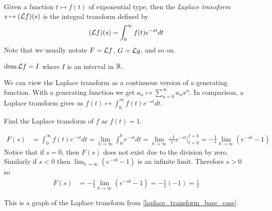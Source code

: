 \documentclass[notes]{subfiles}
\begin{document}
\begin{definition}
    Given a function $t \mapsto f(t)$ of exponential type, then the \textit{Laplace transform} $s \mapsto (\mathcal{L} f)(s)$ is the integral transform defined by
    \[
        (\mathcal{L} f)(s) = \int_0^\infty f(t)e^{-st}dt
    \]
    Note that we usually notate $F = \mathcal{L} f$, $G = \mathcal{L} g$, and so on.
\end{definition}

\begin{theorem}
    $\operatorname{dom} \mathcal{L} f = I$ where $I$ is an interval in $\mathbb{R}$.
\end{theorem}

We can view the Laplace transform as a continuous version of a generating function. With a generating function we get $a_n \mapsto \sum_{n = 0}^\infty a_n x^n$. In comparison, a Laplace transform gives us $f(t) \mapsto \int_0^\infty f(t)e^{-st}dt$.

\begin{exercise} \label{laplace_transform_base_case}
    Find the Laplace transform of $f$ as $f(t) = 1$.
\end{exercise}
\begin{solution}
    \begin{align*}
        F(s)
        &= \int_0^\infty f(t)e^{-st}dt
        = \lim_{b\to\infty} \int_0^b e^{-st}dt
        = \lim_{b\to\infty} \frac{-1}{s}e^{-st}\Big|_{t = 0}^{t = b}
        = -\frac{1}{s} \lim_{b\to\infty} (e^{-sb} - 1)
    \end{align*}
    Notice that if $s = 0$, then $F(s)$ does not exist due to the division by zero. Similarly if $s < 0$ then $\lim_{b\to\infty} (e^{-sb} - 1)$ is an infinite limit. Therefore $s > 0$ so
    \begin{align*}
        F(s)
        &= -\frac{1}{s} \lim_{b\to\infty} (e^{-sb} - 1)
        = -\frac{1}{s}(-1)
        = \frac{1}{s}
    \end{align*}
\end{solution}

This is a graph of the Laplace transform from \cref{laplace_transform_base_case}.
\end{document}
